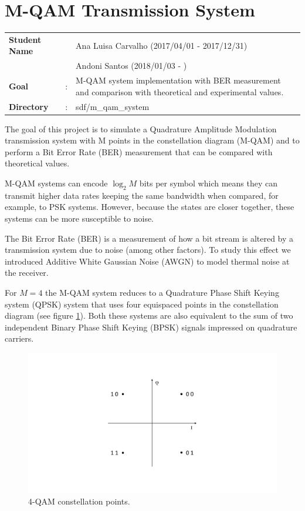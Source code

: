 \clearpage
\section{M-QAM Transmission System}

\begin{tcolorbox}	
	\begin{tabular}{p{2.75cm} p{0.2cm} p{10.5cm}} 	
		\textbf{Student Name}  & & Ana Luisa Carvalho (2017/04/01 - 2017/12/31) \\
                               & & Andoni Santos (2018/01/03 - )\\
		\textbf{Goal}          &:& M-QAM system implementation with BER measurement and comparison with theoretical and experimental values.\\
		\textbf{Directory} &:& sdf/m\_qam\_system
	\end{tabular}
\end{tcolorbox}

The goal of this project is to simulate a Quadrature Amplitude Modulation transmission system with M points in the constellation diagram (M-QAM) and to perform a Bit Error Rate (BER) measurement that can be compared with theoretical values.

M-QAM systems can encode $\log_2 M$ bits per symbol which means they can transmit higher data rates keeping the same bandwidth when compared, for example, to PSK systems. However, because the states are closer together, these systems can be more susceptible to noise.

The Bit Error Rate (BER) is a measurement of how a bit stream is altered by a transmission system due to noise (among other factors). To study this effect we introduced Additive White Gaussian Noise (AWGN) to model thermal noise at the receiver.

For $M=4$ the M-QAM system reduces to a Quadrature Phase Shift Keying system (QPSK) system that uses four equispaced points in the constellation diagram (see figure \ref{fig:const}). Both these systems are also equivalent to the sum of two independent Binary Phase Shift Keying (BPSK) signals impressed on quadrature carriers.

\begin{figure}[h]
	\centering
	\includegraphics[clip, trim=1cm 3cm 1cm 3cm, width=\textwidth]{./sdf/m_qam_system/figures/MQAM_constellation.pdf}
	\caption{4-QAM constellation points.}
	\label{fig:const}
\end{figure}

